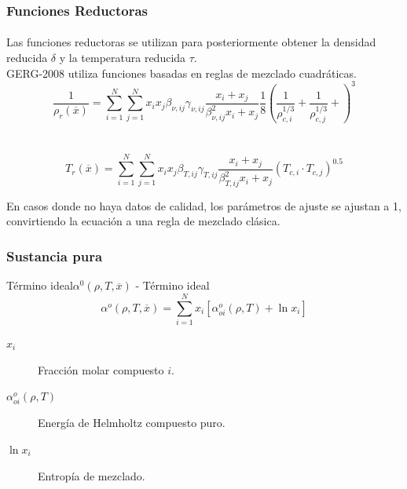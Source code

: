 \documentclass[aspectratio=1610,multi,rgb]{beamer}
\begin{document}
\begin{frame}
	\frametitle{Funciones Reductoras}
	\framesubtitle{}
	Las funciones reductoras se utilizan para posteriormente obtener
	la densidad reducida $\delta$ y la temperatura reducida $\tau$. \\
	GERG-2008 utiliza funciones basadas en reglas de mezclado
	cuadráticas.
	\begin{equation}
	\frac{1}{\rho_r(\overline{x})} = 
		\sum\limits_{i=1}^{N}\sum\limits_{j=1}^{N}
		x_ix_j\beta_{\nu,ij}\gamma_{\nu,ij}
		\frac{x_i+x_j}{\beta_{\nu,ij}^2x_i+x_j}
		\frac{1}{8}\left(
			\frac{1}{\rho_{c,i}^{1/3}} +
			\frac{1}{\rho_{c,j}^{1/3}} +
		\right)^3
	\end{equation}
	\\~\\
	\begin{equation}
		T_r(\overline{x}) = 
		\sum\limits_{i=1}^{N}\sum\limits_{j=1}^{N}
		x_ix_j\beta_{T,ij}\gamma_{T,ij}
		\frac{x_i+x_j}{\beta_{T,ij}^2x_i+x_j}
		\left(
			T_{c,i} \cdot T_{c,j}
		\right)^{0.5}
	\end{equation}

	En casos donde no haya datos de calidad, los parámetros de ajuste 
	se ajustan a 1, convirtiendo la ecuación a una regla de mezclado 
	clásica.

\end{frame}

\subsubsection{Sustancia pura}
\begin{frame}{Término ideal}{$\alpha^0(\rho,T,\overline{x})$ -
	Término ideal}
	\begin{equation}
		\alpha^o(\rho,T,\overline{x}) = 
			\sum\limits_{i=1}^Nx_i[
				\alpha^o_{oi}(\rho,T) + \ln x_i
				]
	\end{equation}
	\begin{description}
	\item[\textbf{$x_i$}] Fracción molar compuesto $i$.
	\item[\textbf{$\alpha^o_{oi}(\rho,T)$}]
		Energía de Helmholtz compuesto 
		puro.
	\item[\textbf{$\ln x_i$}] Entropía de mezclado.
	\end{description}
\end{frame}
\end{document}
